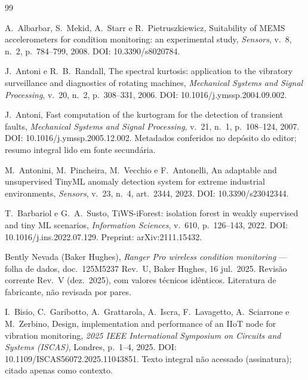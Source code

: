 \documentclass[11pt,a4paper]{article}
\begin{document}
\begin{thebibliography}{99}
\setlength{\itemsep}{2pt}

A.~Albarbar, S.~Mekid, A.~Starr e R.~Pietruszkiewicz,
\newblock Suitability of MEMS accelerometers for condition monitoring: an experimental study,
\newblock \emph{Sensors}, v.~8, n.~2, p.~784--799, 2008.
\newblock DOI: 10.3390/s8020784.

J.~Antoni e R.~B.~Randall,
\newblock The spectral kurtosis: application to the vibratory surveillance and diagnostics of rotating machines,
\newblock \emph{Mechanical Systems and Signal Processing}, v.~20, n.~2, p.~308--331, 2006.
\newblock DOI: 10.1016/j.ymssp.2004.09.002.

J.~Antoni,
\newblock Fast computation of the kurtogram for the detection of transient faults,
\newblock \emph{Mechanical Systems and Signal Processing}, v.~21, n.~1, p.~108--124, 2007.
\newblock DOI: 10.1016/j.ymssp.2005.12.002.
\newblock Metadados conferidos no depósito do editor; resumo integral lido em fonte secundária.

M.~Antonini, M.~Pincheira, M.~Vecchio e F.~Antonelli,
\newblock An adaptable and unsupervised TinyML anomaly detection system for extreme industrial environments,
\newblock \emph{Sensors}, v.~23, n.~4, art.~2344, 2023.
\newblock DOI: 10.3390/s23042344.

T.~Barbariol e G.~A.~Susto,
\newblock TiWS-iForest: isolation forest in weakly supervised and tiny ML scenarios,
\newblock \emph{Information Sciences}, v.~610, p.~126--143, 2022.
\newblock DOI: 10.1016/j.ins.2022.07.129. Preprint: arXiv:2111.15432.

Bently Nevada (Baker Hughes),
\newblock \emph{Ranger Pro wireless condition monitoring} --- folha de dados, doc.\ 125M5237 Rev.~U,
\newblock Baker Hughes, 16 jul.\ 2025. Revisão corrente Rev.~V (dez.\ 2025), com valores técnicos idênticos.
\newblock Literatura de fabricante, não revisada por pares.

I.~Bisio, C.~Garibotto, A.~Grattarola, A.~Iscra, F.~Lavagetto, A.~Sciarrone e M.~Zerbino,
\newblock Design, implementation and performance of an IIoT node for vibration monitoring,
\newblock \emph{2025 IEEE International Symposium on Circuits and Systems (ISCAS)}, Londres, p.~1--4, 2025.
\newblock DOI: 10.1109/ISCAS56072.2025.11043851.
\newblock Texto integral não acessado (assinatura); citado apenas como contexto.


\end{thebibliography}
\end{document}
